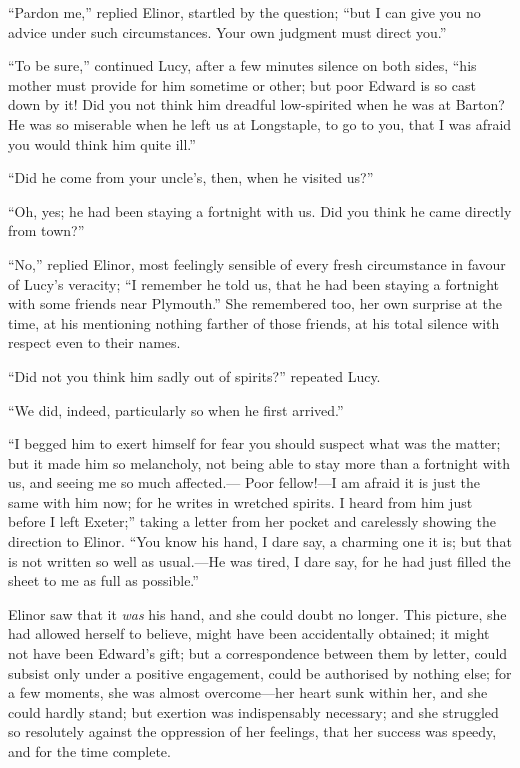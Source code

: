 ``Pardon me,'' replied Elinor, startled by the question;
``but I can give you no advice under such circumstances.
Your own judgment must direct you.''

``To be sure,'' continued Lucy, after a few minutes
silence on both sides, ``his mother must provide for him
sometime or other; but poor Edward is so cast down by it!
Did you not think him dreadful low-spirited when he was at
Barton?  He was so miserable when he left us at Longstaple,
to go to you, that I was afraid you would think him quite ill.''

``Did he come from your uncle's, then, when he visited us?''

``Oh, yes; he had been staying a fortnight with us.
Did you think he came directly from town?''

``No,'' replied Elinor, most feelingly sensible of
every fresh circumstance in favour of Lucy's veracity;
``I remember he told us, that he had been staying
a fortnight with some friends near Plymouth.''
She remembered too, her own surprise at the time,
at his mentioning nothing farther of those friends,
at his total silence with respect even to their names.

``Did not you think him sadly out of spirits?''
repeated Lucy.

``We did, indeed, particularly so when he first arrived.''

``I begged him to exert himself for fear you
should suspect what was the matter; but it made him
so melancholy, not being able to stay more than a
fortnight with us, and seeing me so much affected.---%
Poor fellow!---I am afraid it is just the same with him now;
for he writes in wretched spirits.  I heard from him just
before I left Exeter;'' taking a letter from her pocket
and carelessly showing the direction to Elinor.
``You know his hand, I dare say, a charming one it is;
but that is not written so well as usual.---He was tired,
I dare say, for he had just filled the sheet to me as full
as possible.''

Elinor saw that it \emph{was} his hand, and she could doubt
no longer.  This picture, she had allowed herself to believe,
might have been accidentally obtained; it might not have
been Edward's gift; but a correspondence between them
by letter, could subsist only under a positive engagement,
could be authorised by nothing else; for a few moments, she
was almost overcome---her heart sunk within her, and she could
hardly stand; but exertion was indispensably necessary;
and she struggled so resolutely against the oppression
of her feelings, that her success was speedy, and for
the time complete.

